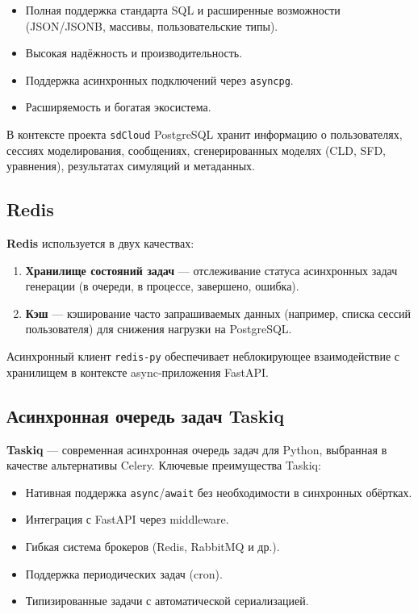 \begin{itemize}
    \item Полная поддержка стандарта SQL и расширенные возможности (JSON/JSONB, массивы, пользовательские типы).
    \item Высокая надёжность и производительность.
    \item Поддержка асинхронных подключений через \texttt{asyncpg}.
    \item Расширяемость и богатая экосистема.
\end{itemize}

В контексте проекта \texttt{sdCloud} PostgreSQL хранит информацию о пользователях, сессиях моделирования, сообщениях, сгенерированных моделях (CLD, SFD, уравнения), результатах симуляций и метаданных.

\subsection{Redis}

\textbf{Redis} \cite{redis2024} используется в двух качествах:

\begin{enumerate}
    \item \textbf{Хранилище состояний задач} --- отслеживание статуса асинхронных задач генерации (в очереди, в процессе, завершено, ошибка).
    \item \textbf{Кэш} --- кэширование часто запрашиваемых данных (например, списка сессий пользователя) для снижения нагрузки на PostgreSQL.
\end{enumerate}

Асинхронный клиент \texttt{redis-py} обеспечивает неблокирующее взаимодействие с хранилищем в контексте async-приложения FastAPI.

\subsection{Асинхронная очередь задач Taskiq}

\textbf{Taskiq} \cite{taskiq2024} --- современная асинхронная очередь задач для Python, выбранная в качестве альтернативы Celery. Ключевые преимущества Taskiq:

\begin{itemize}
    \item Нативная поддержка \texttt{async}/\texttt{await} без необходимости в синхронных обёртках.
    \item Интеграция с FastAPI через middleware.
    \item Гибкая система брокеров (Redis, RabbitMQ и др.).
    \item Поддержка периодических задач (cron).
    \item Типизированные задачи с автоматической сериализацией.
\end{itemize}

